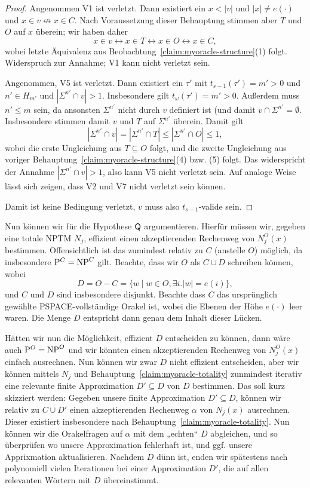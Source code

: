\begin{proof}
    Angenommen V1 ist verletzt. Dann existiert ein $x<|v|$ und $|x|\neq e(\cdot)$ und $x\in v \not\leftrightarrow x\in C$.
    Nach Voraussetzung dieser Behauptung stimmen aber $T$ und $O$ auf $x$ überein; wir haben daher
    \[ x\in v \leftrightarrow x\in T \leftrightarrow x\in O \leftrightarrow x\in C, \]
    wobei letzte Äquivalenz aus Beobachtung~\ref{claim:myoracle-structure}(1) folgt. Widerspruch zur Annahme; V1 kann nicht verletzt sein.

    Angenommen, V5 ist verletzt. Dann existiert ein $\tau'$ mit $t_{s-1}(\tau')=m'>0$ und $n'\in H_{m'}$ und $|\Sigma^{n'}\cap v|>1$. Insbesondere gilt $t_\omega(\tau')=m'>0$.
    Außerdem muss $n'\leq m$ sein, da ansonsten $\Sigma^{n'}$ nicht durch $v$ definiert ist (und damit $v\cap\Sigma^{n'}=\emptyset$.
    Insbesondere stimmen damit $v$ und $T$ auf $\Sigma^{n'}$ überein.
    Damit gilt
    \[ |\Sigma^{n'}\cap v|=|\Sigma^{n'}\cap T|\leq |\Sigma^{n'}\cap O| \leq 1, \]
    wobei die erste Ungleichung aus $T\subseteq O$ folgt, und die zweite Ungleichung aus voriger Behauptung~\ref{claim:myoracle-structure}(4) bzw. (5) folgt.
    Das widerspricht der Annahme $|\Sigma^{n'}\cap v|>1$, also kann V5 nicht verletzt sein. Auf analoge Weise lässt sich zeigen, dass V2 und V7 nicht verletzt sein können.

    Damit ist keine Bedingung verletzt, $v$ muss also $t_{s-1}$-valide sein.
\end{proof}

Nun können wir für die Hypothese $\mathsf{Q}$ argumentieren.
Hierfür müssen wir, gegeben eine totale NPTM $N_j$, effizient einen akzeptierenden Rechenweg von $N_j^O(x)$ bestimmen.
Offensichtlich ist das zumindest relativ zu $C$ (anstelle $O$) möglich, da insbesondere $\mathrm{P}^C=\mathrm{NP}^C$ gilt.
Beachte, dass wir $O$ als $C\cup D$ schreiben können, wobei 
\[ D=O-C=\{ w \mid w\in O, \exists i. |w|=e(i) \}, \]
und $C$ und $D$ sind insbesondere disjunkt.
Beachte dass $C$ das ursprünglich gewählte PSPACE-vollständige Orakel ist, wobei die Ebenen der Höhe $e(\cdot)$ leer waren. Die Menge $D$ entspricht dann genau dem Inhalt dieser Lücken.

Hätten wir nun die Möglichkeit, effizient $D$ entscheiden zu können, dann wäre auch $\mathrm{P}^{O}=\mathrm{NP}^{O}$ und wir könnten einen akzeptierenden Rechenweg von $N_j^O(x)$ einfach ausrechnen.
Nun können wir zwar $D$ nicht effizient entscheiden, aber wir können mittels $N_j$ und Behauptung~\ref{claim:myoracle-totality} zunmindest iterativ eine relevante finite Approximation $D'\subseteq D$ von $D$ bestimmen.
Das soll kurz skizziert werden: Gegeben unsere finite Approximation $D'\subseteq D$, können wir relativ zu $C\cup D'$ einen akzeptierenden Rechenweg $\alpha$ von $N_j(x)$ ausrechnen. Dieser existiert insbesondere nach Behauptung~\ref{claim:myoracle-totality}. Nun können wir die Orakelfragen auf $\alpha$ mit dem „echten“ $D$ abgleichen, und so überprüfen wo unsere Approximation fehlerhaft ist, und ggf. unsere Apprixmation aktualisieren. Nachdem $D$ dünn ist,  enden wir spätestens nach polynomiell vielen Iterationen bei einer Approximation $D'$, die auf allen relevanten Wörtern mit $D$ übereinstimmt.


